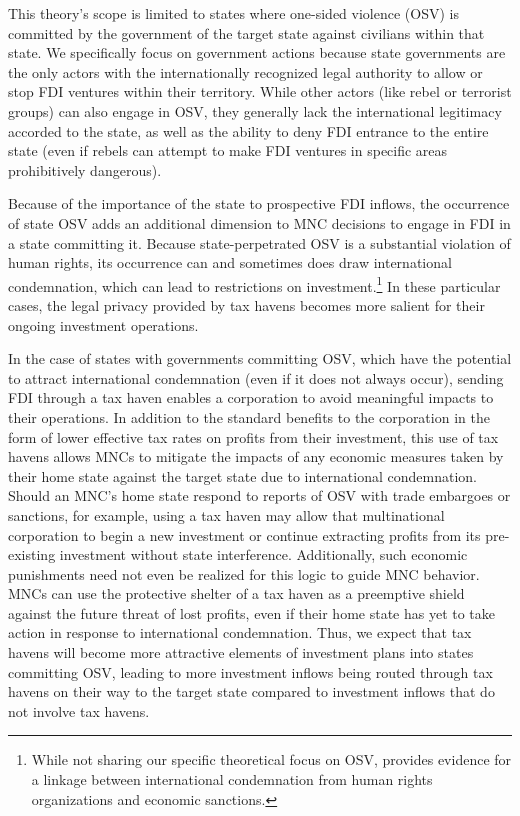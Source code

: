 \documentclass[11pt, titlepage]{article} %
\begin{document}
This theory's scope is limited to states where one-sided violence (OSV) is committed by the government of the target state against civilians within that state. We specifically focus on government actions because state governments are the only actors with the internationally recognized legal authority to allow or stop FDI ventures within their territory. While other actors (like rebel or terrorist groups) can also engage in OSV, they generally lack the international legitimacy accorded to the state, as well as the ability to deny FDI entrance to the entire state (even if rebels can attempt to make FDI ventures in specific areas prohibitively dangerous). 

Because of the importance of the state to prospective FDI inflows, the occurrence of state OSV adds an additional dimension to MNC decisions to engage in FDI in a state committing it. Because state-perpetrated OSV is a substantial violation of human rights, its occurrence can and sometimes does draw international condemnation, which can lead to restrictions on investment.\footnote{While not sharing our specific theoretical focus on OSV, \textcite{murdie2013impact} provides evidence for a linkage between international condemnation from human rights organizations and economic sanctions.} In these particular cases, the legal privacy provided by tax havens becomes more salient for their ongoing investment operations.

In the case of states with governments committing OSV, which have the potential to attract international condemnation (even if it does not always occur), sending FDI through a tax haven enables a corporation to avoid meaningful impacts to their operations. In addition to the standard benefits to the corporation in the form of lower effective tax rates on profits from their investment, this use of tax havens allows MNCs to mitigate the impacts of any economic measures taken by their home state against the target state due to international condemnation. Should an MNC's home state respond to reports of OSV with trade embargoes or sanctions, for example, using a tax haven may allow that multinational corporation to begin a new investment or continue extracting profits from its pre-existing investment without state interference. Additionally, such economic punishments need not even be realized for this logic to guide MNC behavior. MNCs can use the protective shelter of a tax haven as a preemptive shield against the future threat of lost profits, even if their home state has yet to take action in response to international condemnation. Thus, we expect that tax havens will become more attractive elements of investment plans into states committing OSV, leading to more investment inflows being routed through tax havens on their way to the target state compared to investment inflows that do not involve tax havens.
\end{document}
